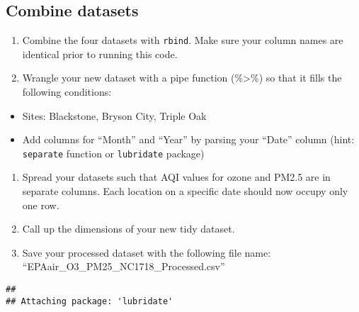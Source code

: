 \documentclass[]{article}
\newenvironment{Shaded}{\begin{snugshade}}{\end{snugshade}}
\newcommand{\KeywordTok}[1]{\textcolor[rgb]{0.13,0.29,0.53}{\textbf{#1}}}
\newcommand{\StringTok}[1]{\textcolor[rgb]{0.31,0.60,0.02}{#1}}
\newcommand{\CommentTok}[1]{\textcolor[rgb]{0.56,0.35,0.01}{\textit{#1}}}
\newcommand{\NormalTok}[1]{#1}
\providecommand{\tightlist}{%
  \setlength{\itemsep}{0pt}\setlength{\parskip}{0pt}}
\begin{document}
\subsection{Combine datasets}\label{combine-datasets}

\begin{enumerate}
\def\labelenumi{\arabic{enumi}.}
\setcounter{enumi}{6}
\tightlist
\item
  Combine the four datasets with \texttt{rbind}. Make sure your column
  names are identical prior to running this code.
\item
  Wrangle your new dataset with a pipe function (\%\textgreater{}\%) so
  that it fills the following conditions:
\end{enumerate}

\begin{itemize}
\tightlist
\item
  Sites: Blackstone, Bryson City, Triple Oak
\item
  Add columns for ``Month'' and ``Year'' by parsing your ``Date'' column
  (hint: \texttt{separate} function or \texttt{lubridate} package)
\end{itemize}

\begin{enumerate}
\def\labelenumi{\arabic{enumi}.}
\setcounter{enumi}{8}
\tightlist
\item
  Spread your datasets such that AQI values for ozone and PM2.5 are in
  separate columns. Each location on a specific date should now occupy
  only one row.
\item
  Call up the dimensions of your new tidy dataset.
\item
  Save your processed dataset with the following file name:
  ``EPAair\_O3\_PM25\_NC1718\_Processed.csv''
\end{enumerate}

\begin{Shaded}
\end{Shaded}

\begin{verbatim}
## 
## Attaching package: 'lubridate'
\end{verbatim}
\end{document}
